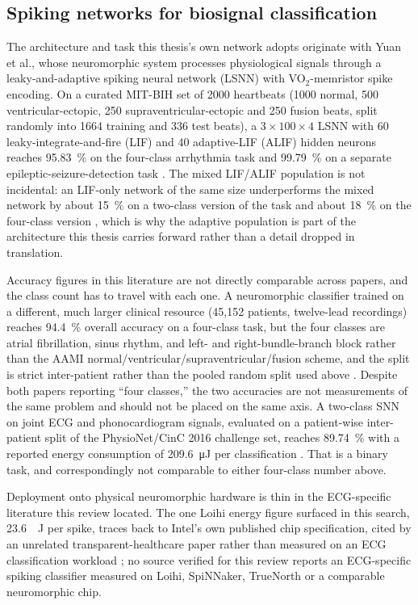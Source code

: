 \subsection{Spiking networks for biosignal classification}

The architecture and task this thesis's own network adopts originate with Yuan et al.,
whose neuromorphic system processes physiological signals through a leaky-and-adaptive
spiking neural network (LSNN) with VO$_2$-memristor spike encoding. On a curated MIT-BIH
set of 2000 heartbeats (1000 normal, 500 ventricular-ectopic, 250 supraventricular-ectopic
and 250 fusion beats, split randomly into 1664 training and 336 test beats), a
$3\times100\times4$ LSNN with 60 leaky-integrate-and-fire (LIF) and 40 adaptive-LIF (ALIF)
hidden neurons reaches \SI{95.83}{\percent} on the four-class arrhythmia task and
\SI{99.79}{\percent} on a separate epileptic-seizure-detection task
\cite{Yuan2023_NatComm}. The mixed LIF/ALIF population is not incidental: an LIF-only
network of the same size underperforms the mixed network by about \SI{15}{\percent} on a
two-class version of the task and about \SI{18}{\percent} on the four-class version
\cite{Yuan2023_NatComm}, which is why the adaptive population is part of the architecture
this thesis carries forward rather than a detail dropped in translation.

Accuracy figures in this literature are not directly comparable across papers, and the
class count has to travel with each one. A neuromorphic classifier trained on a
different, much larger clinical resource (45{,}152 patients, twelve-lead recordings)
reaches \SI{94.4}{\percent} overall accuracy on a four-class task, but the four classes
are atrial fibrillation, sinus rhythm, and left- and right-bundle-branch block rather than
the AAMI normal/ventricular/supraventricular/fusion scheme, and the split is strict
inter-patient rather than the pooled random split used above \cite{Kolhar2025_SciRep}.
Despite both papers reporting ``four classes,'' the two accuracies are not measurements of
the same problem and should not be placed on the same axis. A two-class SNN on joint ECG
and phonocardiogram signals, evaluated on a patient-wise inter-patient split of the
PhysioNet/CinC 2016 challenge set, reaches \SI{89.74}{\percent} with a reported energy
consumption of \SI{209.6}{\micro\joule} per classification \cite{Ran2025_Sensors}. That
is a binary task, and correspondingly not comparable to either four-class number
above.

Deployment onto physical neuromorphic hardware is thin in the ECG-specific literature
this review located. The one Loihi energy figure surfaced in this search, \SI{23.6}{\pico
\joule} per spike, traces back to Intel's own published chip specification, cited by an
unrelated transparent-healthcare paper rather than measured on an ECG classification
workload \cite{Sungheetha2026_SciRep}; no source verified for this review reports an
ECG-specific spiking classifier measured on Loihi, SpiNNaker, TrueNorth or a comparable
neuromorphic chip.

